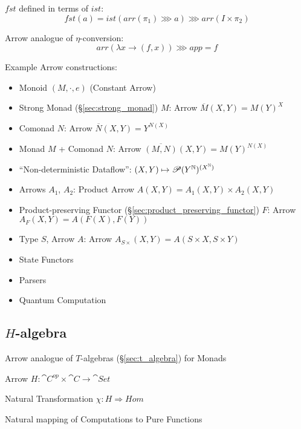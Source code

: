 $fst$ defined in terms of $ist$:
\[
  fst(a) = ist(arr(\pi_1) \ggg a) \ggg arr(I \times \pi_2)
\]

Arrow analogue of $\eta$-conversion:\cite{hughes98}
\[
  arr (\lambda x \rightarrow (f,x)) \ggg app = f
\]

Example Arrow constructions:
\begin{itemize}
  \item Monoid $(M,\cdot,e)$ (Constant Arrow)
  \item Strong Monad (\S\ref{sec:strong_monad}) $M$: Arrow
    $\overline{M}(X,Y) = M(Y)^X$
  \item Comonad $N$: Arrow $\overline{N}(X,Y) = Y^{N(X)}$
  \item Monad $M$ + Comonad $N$: Arrow
    $\overline{(M,N)}(X,Y) = M(Y)^{N(X)}$
  \item ``Non-deterministic Dataflow'':
    $(X,Y) \mapsto \mathscr{P}(Y^{\mathbb{N}})^{(X^{\mathbb{N}})}$
  \item Arrows $A_1$, $A_2$: Product Arrow
    $A(X,Y) = A_1(X,Y) \times A_2(X,Y)$
  \item Product-preserving Functor
    (\S\ref{sec:product_preserving_functor}) $F$: Arrow
    $A_F(X,Y) = A(F(X),F(Y))$
  \item Type $S$, Arrow $A$: Arrow
    $A_{S\times}(X,Y) = A(S \times X, S \times Y)$
  \item State Functors
  \item Parsers
  \item Quantum Computation
\end{itemize}
\cite{jacobs-heunen-hasuo09}



\subsection{$H$-algebra}\label{sec:h_algebra}
\cite{jacobs-heunen-hasuo09}


Arrow analogue of $T$-algebras (\S\ref{sec:t_algebra}) for Monads

Arrow $H : \cat{C}^{op} \times \cat{C} \rightarrow \cat{Set}$

Natural Transformation $\chi : H \Rightarrow Hom$

Natural mapping of Computations to Pure Functions

